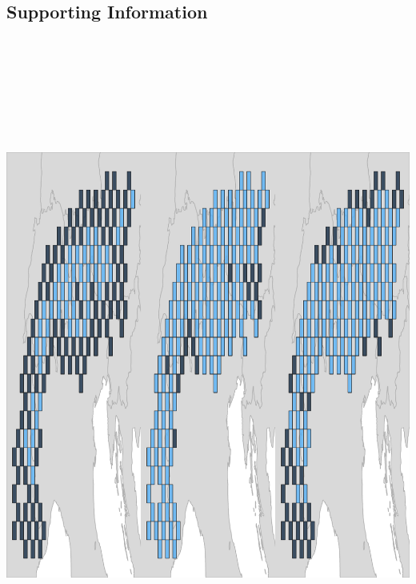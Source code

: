 \documentclass[11pt,]{article}
\title{}
\author{}
\date{}
\let\origfigure\figure
\let\endorigfigure\endfigure
\renewenvironment{figure}[1][2] {
	\expandafter\origfigure\expandafter[H]
} {
	\endorigfigure
}
\begin{document}
\maketitle


\subsection{Supporting Information}\label{supporting-information}

\begin{figure}
\includegraphics[width=7.5in,height=8.5in]{supporting_information_files/figure-latex/unnamed-chunk-2-1} \caption{Species distributions. Squares represent planning units. For a given species, planning units that were found to be inhabited are denoted with bright blue.}\label{fig:unnamed-chunk-2}
\end{figure}
\end{document}
